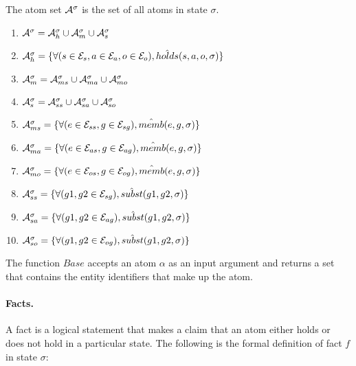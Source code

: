 \documentclass[10pt, twocolumn]{article}
\begin{document}
          The atom set ${\cal A}^{\sigma}$ is the set of all atoms in state
          $\sigma$. 

          \begin{enumerate}
            \item
              ${\cal A}^{\sigma} = {\cal A}^{\sigma}_{h} \cup {\cal A}^{\sigma}_{m} \cup {\cal A}^{\sigma}_{s}$
            \item
              ${\cal A}^{\sigma}_{h} = \{\forall (s \in {\cal E}_{s}, a \in {\cal E}_{a}, o \in {\cal E}_{o}), \hat{holds}(s, a, o, \sigma) \}$
            \item
              ${\cal A}^{\sigma}_{m} = {\cal A}^{\sigma}_{ms} \cup {\cal A}^{\sigma}_{ma} \cup {\cal A}^{\sigma}_{mo}$
            \item
              ${\cal A}^{\sigma}_{s} = {\cal A}^{\sigma}_{ss} \cup {\cal A}^{\sigma}_{sa} \cup {\cal A}^{\sigma}_{so}$
            \item
              ${\cal A}^{\sigma}_{ms} = \{\forall (e \in {\cal E}_{ss}, g \in {\cal E}_{sg}), \hat{memb}(e, g, \sigma)\}$
            \item
              ${\cal A}^{\sigma}_{ma} = \{\forall (e \in {\cal E}_{as}, g \in {\cal E}_{ag}), \hat{memb}(e, g, \sigma)\}$
            \item
              ${\cal A}^{\sigma}_{mo} = \{\forall (e \in {\cal E}_{os}, g \in {\cal E}_{og}), \hat{memb}(e, g, \sigma)\}$
            \item
              ${\cal A}^{\sigma}_{ss} = \{\forall (g1, g2 \in {\cal E}_{sg}), \hat{subst}(g1, g2, \sigma)\}$
            \item
              ${\cal A}^{\sigma}_{sa} = \{\forall (g1, g2 \in {\cal E}_{ag}), \hat{subst}(g1, g2, \sigma)\}$
            \item
              ${\cal A}^{\sigma}_{so} = \{\forall (g1, g2 \in {\cal E}_{og}), \hat{subst}(g1, g2, \sigma)\}$
          \end{enumerate}

          The function $Base$ accepts an atom $\alpha$ as an input argument and
          returns a set that contains the entity identifiers that make up the
          atom.

        \paragraph{Facts.}
       
          A fact is a logical statement that makes a claim that an atom either
          holds or does not hold in a particular state. The following is the
          formal definition of fact $f$ in state $\sigma$:
\end{document}
